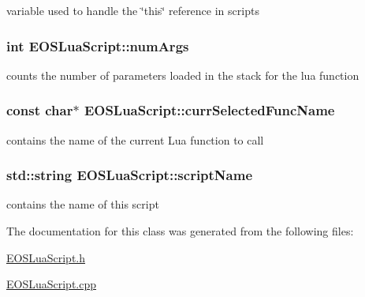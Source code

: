 variable used to handle the \char`\"{}this\char`\"{} reference in scripts 

\hypertarget{classEOSLuaScript_b86282ecf112d657fd92b29b4e21a40e}{
\subsubsection[{numArgs}]{\setlength{\rightskip}{0pt plus 5cm}int {\bf EOSLuaScript::numArgs}}}
\label{classEOSLuaScript_b86282ecf112d657fd92b29b4e21a40e}


counts the number of parameters loaded in the stack for the lua function 

\hypertarget{classEOSLuaScript_f4fddb1fd2af7b266cb7b41f6b50a047}{
\subsubsection[{currSelectedFuncName}]{\setlength{\rightskip}{0pt plus 5cm}const char$\ast$ {\bf EOSLuaScript::currSelectedFuncName}}}
\label{classEOSLuaScript_f4fddb1fd2af7b266cb7b41f6b50a047}


contains the name of the current Lua function to call 

\hypertarget{classEOSLuaScript_7ca6cc5f26c5cfad510e9391e5815d8c}{
\subsubsection[{scriptName}]{\setlength{\rightskip}{0pt plus 5cm}std::string {\bf EOSLuaScript::scriptName}}}
\label{classEOSLuaScript_7ca6cc5f26c5cfad510e9391e5815d8c}


contains the name of this script 



The documentation for this class was generated from the following files:\begin{CompactItemize}
\item 
\hyperlink{EOSLuaScript_8h}{EOSLuaScript.h}\item 
\hyperlink{EOSLuaScript_8cpp}{EOSLuaScript.cpp}\end{CompactItemize}
